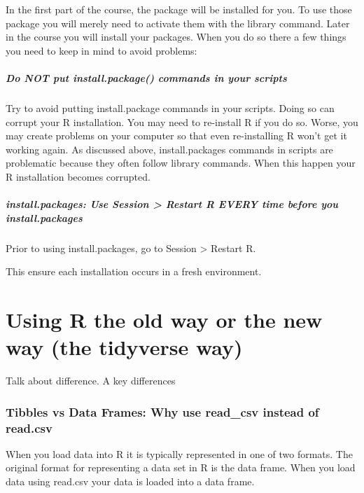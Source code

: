 \documentclass[
]{krantz}
\begin{document}
In the first part of the course, the package will be installed for you. To use those package you will merely need to activate them with the library command. Later in the course you will install your packages. When you do so there a few things you need to keep in mind to avoid problems:

\hypertarget{do-not-put-install.package-commands-in-your-scripts}{%
\subparagraph{Do NOT put install.package() commands in your scripts}\label{do-not-put-install.package-commands-in-your-scripts}}

Try to avoid putting install.package commands in your scripts. Doing so can corrupt your R installation. You may need to re-install R if you do so. Worse, you may create problems on your computer so that even re-installing R won't get it working again. As discussed above, install.packages commands in scripts are problematic because they often follow library commands. When this happen your R installation becomes corrupted.

\hypertarget{install.packages-use-session-restart-r-every-time-before-you-install.packages}{%
\subparagraph{install.packages: Use Session \textgreater{} Restart R EVERY time before you install.packages}\label{install.packages-use-session-restart-r-every-time-before-you-install.packages}}

Prior to using install.packages, go to Session \textgreater{} Restart R.

This ensure each installation occurs in a fresh environment.

\hypertarget{using-r-the-old-way-or-the-new-way-the-tidyverse-way}{%
\section{Using R the old way or the new way (the tidyverse way)}\label{using-r-the-old-way-or-the-new-way-the-tidyverse-way}}

Talk about difference. A key differences

\hypertarget{tibbles-vs-data-frames-why-use-read_csv-instead-of-read.csv}{%
\subsubsection{Tibbles vs Data Frames: Why use read\_csv instead of read.csv}\label{tibbles-vs-data-frames-why-use-read_csv-instead-of-read.csv}}

When you load data into R it is typically represented in one of two formats. The original format for representing a data set in R is the data frame. When you load data using read.csv your data is loaded into a data frame.
\end{document}
